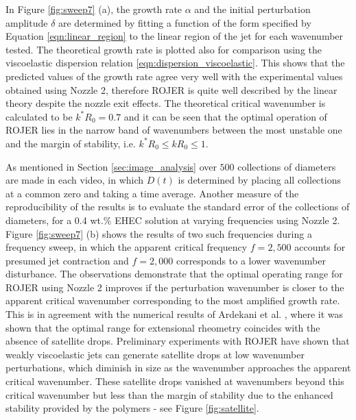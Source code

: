 \documentclass[11pt]{article}
\begin{document}
In Figure \ref{fig:sweep7} (a), the growth rate $\alpha$ and the initial perturbation amplitude $\delta$ are determined by fitting a function of the form specified by Equation \ref{eqn:linear_region} to the linear region of the jet for each wavenumber tested. The theoretical growth rate is plotted also for comparison using the viscoelastic dispersion relation \ref{eqn:dispersion_viscoelastic}. This shows that the predicted values of the growth rate agree very well with the experimental values obtained using Nozzle 2, therefore ROJER is quite well described by the linear theory despite the nozzle exit effects. The theoretical critical wavenumber is calculated to be $k^*R_0 = 0.7$ and it can be seen that the optimal operation of ROJER lies in the narrow band of wavenumbers between the most unstable one and the margin of stability, i.e. $k^* R_0 \leq k R_0 \leq 1$.

As mentioned in Section \ref{sec:image_analysis} over $500$ collections of diameters are made in each video, in which $D(t)$ is determined by placing all collections at a common zero and taking a time average. Another measure of the reproducibility of the results is to evaluate the standard error of the collections of diameters, for a 0.4 wt.\% EHEC solution at varying frequencies using Nozzle 2. Figure \ref{fig:sweep7} (b) shows the results of two such frequencies during a frequency sweep, in which the apparent critical frequency $f = 2,500$ accounts for presumed jet contraction and $f = 2,000$ corresponds to a lower wavenumber disturbance. The observations demonstrate that the optimal operating range for ROJER using Nozzle 2 improves if the perturbation wavenumber is closer to the apparent critical wavenumber corresponding to the most amplified growth rate. This is in agreement with the numerical results of Ardekani et al. \cite{ardekani2010dynamics}, where it was shown that the optimal range for extensional rheometry coincides with the absence of satellite drops. Preliminary experiments with ROJER have shown that weakly viscoelastic jets can generate satellite drops at low wavenumber perturbations, which diminish in size as the wavenumber approaches the apparent critical wavenumber. These satellite drops vanished at wavenumbers beyond this critical wavenumber but less than the margin of stability due to the enhanced stability provided by the polymers - see Figure \ref{fig:satellite}. 
\end{document}
